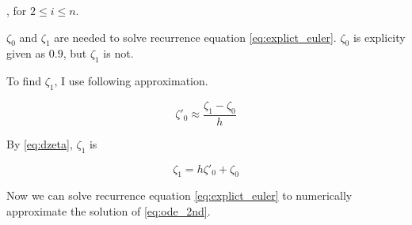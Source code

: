 \documentclass{article}
\begin{document}
, for $ 2 \leq i \leq n$.

$\zeta_0$ and $\zeta_1$ are needed to solve recurrence equation \eqref{eq:explict_euler}.
$\zeta_0$ is explicity given as $0.9$, but $\zeta_1$ is not.

To find $\zeta_1$, I use following approximation.

\begin{equation}
  \label{eq:dzeta}
  \zeta'_0 \approx \frac{\zeta_1 - \zeta_0}{h}
\end{equation}

By \eqref{eq:dzeta}, $\zeta_1$ is

\begin{equation}
  \label{eq:zeta1}
  \zeta_1 = h\zeta'_0 + \zeta_0
\end{equation}

Now we can solve recurrence equation \eqref{eq:explict_euler} to numerically
approximate the solution of \eqref{eq:ode_2nd}.
  
\end{document}
